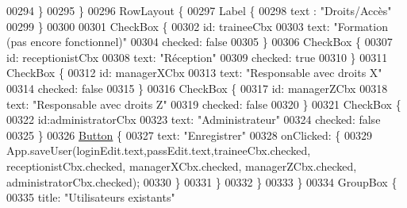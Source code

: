 \begin{DoxyCode}
00294                             \}
00295                         \}
00296                         RowLayout \{
00297                             Label \{
00298                                 text : \textcolor{stringliteral}{"Droits/Accès"}
00299                             \}
00300 
00301                             CheckBox \{
00302                                 \textcolor{keywordtype}{id}: traineeCbx
00303                                 text: \textcolor{stringliteral}{"Formation (pas encore fonctionnel)"}
00304                                 checked: \textcolor{keyword}{false}
00305                             \}
00306                             CheckBox \{
00307                                 \textcolor{keywordtype}{id}: receptionistCbx
00308                                 text: \textcolor{stringliteral}{"Réception"}
00309                                 checked: \textcolor{keyword}{true}
00310                             \}
00311                             CheckBox \{
00312                                 \textcolor{keywordtype}{id}: managerXCbx
00313                                 text: \textcolor{stringliteral}{"Responsable avec droits X"}
00314                                 checked: \textcolor{keyword}{false}
00315                             \}
00316                             CheckBox \{
00317                                 \textcolor{keywordtype}{id}: managerZCbx
00318                                 text: \textcolor{stringliteral}{"Responsable avec droits Z"}
00319                                 checked: \textcolor{keyword}{false}
00320                             \}
00321                             CheckBox \{
00322                                 \textcolor{keywordtype}{id}:administratorCbx
00323                                 text: \textcolor{stringliteral}{"Administrateur"}
00324                                 checked: \textcolor{keyword}{false}
00325                             \}
00326                             \hyperlink{classButton}{Button} \{
00327                                 text: \textcolor{stringliteral}{"Enregistrer"}
00328                                 onClicked: \{
00329                                     App.saveUser(loginEdit.text,passEdit.text,traineeCbx.checked, 
      receptionistCbx.checked,  managerXCbx.checked, managerZCbx.checked, administratorCbx.checked);
00330                                 \}
00331                             \}
00332                         \}
00333                     \}
00334                     GroupBox \{
00335                         title: \textcolor{stringliteral}{"Utilisateurs existants"}

\end{DoxyCode}
